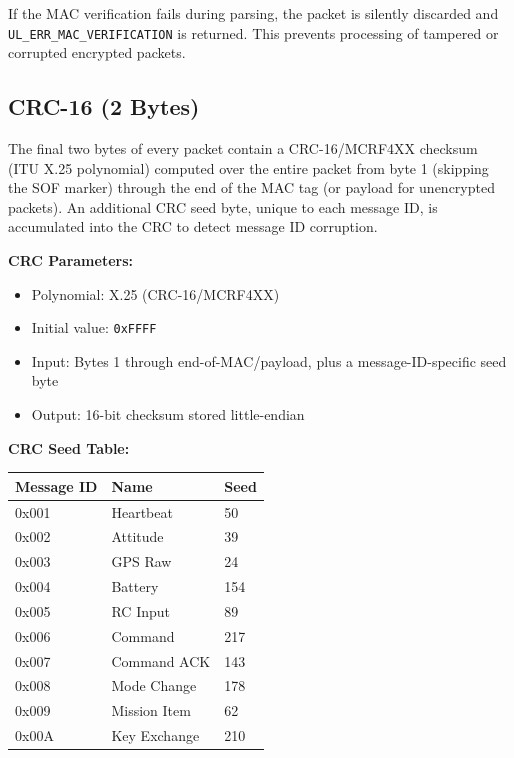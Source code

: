 \documentclass[11pt,a4paper]{article}
\begin{document}
\begin{alertbox}
If the MAC verification fails during parsing, the packet is silently discarded and \texttt{UL\_ERR\_MAC\_VERIFICATION} is returned. This prevents processing of tampered or corrupted encrypted packets.
\end{alertbox}

\subsection{CRC-16 (2 Bytes)}

The final two bytes of every packet contain a CRC-16/MCRF4XX checksum (ITU X.25 polynomial) computed over the entire packet from byte 1 (skipping the SOF marker) through the end of the MAC tag (or payload for unencrypted packets). An additional CRC seed byte, unique to each message ID, is accumulated into the CRC to detect message ID corruption.

\textbf{CRC Parameters:}
\begin{itemize}[noitemsep]
    \item Polynomial: X.25 (CRC-16/MCRF4XX)
    \item Initial value: \texttt{0xFFFF}
    \item Input: Bytes 1 through end-of-MAC/payload, plus a message-ID-specific seed byte
    \item Output: 16-bit checksum stored little-endian
\end{itemize}

\textbf{CRC Seed Table:}
\begin{table}[H]
\centering
\begin{tabular}{@{}lll@{}}
\toprule
\textbf{Message ID} & \textbf{Name} & \textbf{Seed} \\
\midrule
0x001 & Heartbeat & 50 \\
0x002 & Attitude  & 39 \\
0x003 & GPS Raw   & 24 \\
0x004 & Battery   & 154 \\
0x005 & RC Input  & 89 \\
0x006 & Command   & 217 \\
0x007 & Command ACK & 143 \\
0x008 & Mode Change & 178 \\
0x009 & Mission Item & 62 \\
0x00A & Key Exchange & 210 \\
\bottomrule
\end{tabular}
\end{table}
\end{document}

